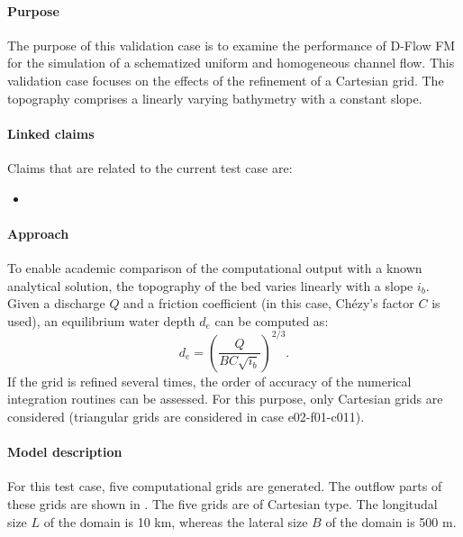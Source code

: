 

\paragraph*{Purpose}
The purpose of this validation case is to examine the performance of D-Flow FM for the simulation of a schematized uniform and homogeneous channel flow. This validation case focuses on the effects of the refinement of a Cartesian grid. The topography comprises a linearly varying bathymetry with a constant slope. 

\paragraph*{Linked claims}
Claims that are related to the current test case are:
\begin{itemize}
\item {}
\end{itemize}


\paragraph*{Approach}
To enable academic comparison of the computational output with a known analytical solution, the topography of the bed varies linearly with a slope $i_b$. Given a discharge $Q$ and a friction coefficient (in this case, Ch\'ezy's factor $C$ is used), an equilibrium water depth $d_e$ can be computed as:
\begin{equation}\label{eq:chezysquareseqdepth}
d_e = \left(\frac{Q}{B C \sqrt{i_b}}\right)^{2/3}.
\end{equation}
If the grid is refined several times, the order of accuracy of the numerical integration routines can be assessed. For this purpose, only Cartesian grids are considered (triangular grids are considered in case e02-f01-c011).



\paragraph*{Model description}
For this test case, five computational grids are generated. The outflow parts of these grids are shown in . The five grids are of Cartesian type. The longitudal size $L$ of the domain is 10 km, whereas the lateral size $B$ of the domain is 500 m. 

